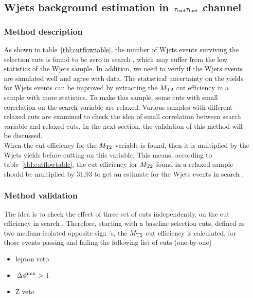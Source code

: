 \subsection{\texorpdfstring{Wjets background estimation in $\,\tau_{\rm had}\tau_{\rm had}$ channel}{Wjets background estimation in tau-tau channel}}
\subsubsection{Method description}

As shown in table~\ref{tbl:cutflowtable}, the number of Wjets events surviving 
the selection cuts is found to be zero in search \binone, which may suffer from the low statistics of the Wjets sample. In addition, we need to verify if the Wjets events are simulated well and agree with data.
 The statistical uncertainty on the yields for Wjets events can be improved by extracting 
the ${M_{\rm T2}}$ cut efficiency in a sample with more statistics. To make this sample, some cuts with small correlation on the search variable are 
relaxed. Various samples with different relaxed cuts are examined to check the idea of small correlation 
between search variable and relaxed cuts. In the next section, the validation of this method will be discussed.\\
When the cut efficiency for the ${M_{\rm T2}}$ variable is found, then it is multiplied by the Wjets 
yields before cutting on this variable. This means, according to table~\ref{tbl:cutflowtable}, the cut efficiency for 
${M_{\rm T2}}$ found in a relaxed sample should be multiplied by 31.93 to get an 
estimate for the Wjets events in search \binone.\\

\subsubsection{Method validation}
The idea is to check the effect of three set of cuts independently, 
on the \mttwo cut efficiency in search \binone. 
Therefore, starting with a baseline selection cuts, defined as two 
medium-isolated opposite sign \Tau's, the ${M_{\rm T2}}$ cut 
efficiency is calculated, for those events passing and failing the following list of cuts (one-by-one)
\begin{itemize}
\item lepton veto
\item $\,{\Delta\phi^{\rm min}}>$ 1
\item Z veto 
\end{itemize}

